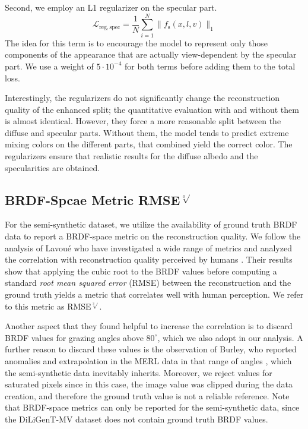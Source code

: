 Second, we employ an L1 regularizer on the specular part.
\begin{equation}
    \mathcal{L}_\mathrm{reg,spec}=\frac{1}{N}\sum_{i=1}^N \|f_\text{s}(x, l, v)\|_1
\end{equation}
The idea for this term is to encourage the model to represent only those components of the appearance that are actually view-dependent by the specular part. We use a weight of $5\cdot 10^{-4}$ for both terms before adding them to the total loss.

Interestingly, the regularizers do not significantly change the reconstruction quality of the enhanced split; the quantitative evaluation with and without them is almost identical. However, they force a more reasonable split between the diffuse and specular parts. Without them, the model tends to predict extreme mixing colors on the different parts, that combined yield the correct color. The regularizers ensure that realistic results for the diffuse albedo and the specularities are obtained.



\subsection{BRDF-Spcae Metric RMSE$^{\sqrt[3]{}}$}
\label{sec:supp:rmse}

For the semi-synthetic dataset, we utilize the availability of ground truth BRDF data to report a BRDF-space metric on the reconstruction quality. We follow the analysis of Lavoué \etal who have 
investigated a wide range of metrics and analyzed the correlation with reconstruction quality perceived by humans \cite{Lavoue21PerceptualQualityOfBRDFApproximations}. Their results show that applying the cubic root to the BRDF values before computing a standard \emph{root mean squared error} (RMSE) between the reconstruction and the ground truth yields a metric that correlates well with human perception. We refer to this metric as RMSE$^{\sqrt[3]{}}$.

Another aspect that they found helpful to increase the correlation is to discard BRDF values for grazing angles above $80^{\circ}$, which we also adopt in our analysis. A further reason to discard these values is the observation of Burley, who reported anomalies and extrapolation in the MERL data in that range of angles \cite{burley2012physically}, which the semi-synthetic data inevitably inherits. Moreover, we reject values for saturated pixels since in this case, the image value was clipped during the data creation, and therefore the ground truth value is not a reliable reference. Note that BRDF-space metrics can only be reported for the semi-synthetic data, since the DiLiGenT-MV dataset does not contain ground truth BRDF values.


